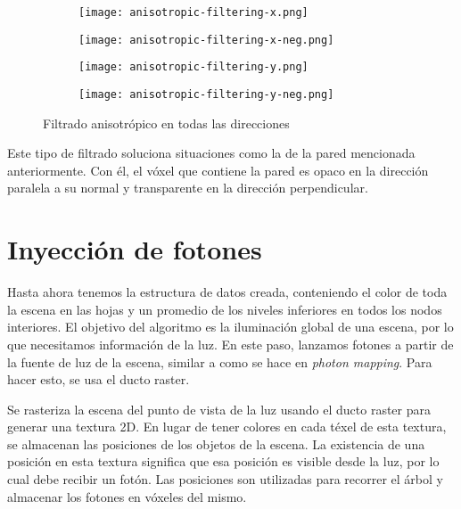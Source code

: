 \begin{figure}
    \begin{center}
        \begin{subfigure}{.24\textwidth}
            \texttt{[image: anisotropic-filtering-x.png]}
        \end{subfigure}
        \begin{subfigure}{.24\textwidth}
            \texttt{[image: anisotropic-filtering-x-neg.png]}
        \end{subfigure}
        \begin{subfigure}{.24\textwidth}
            \texttt{[image: anisotropic-filtering-y.png]}
        \end{subfigure}
        \begin{subfigure}{.24\textwidth}
            \texttt{[image: anisotropic-filtering-y-neg.png]}
        \end{subfigure}
    \end{center}
    \caption{Filtrado anisotrópico en todas las direcciones}
    \label{fig:svo_filtering_anisotropic}
\end{figure}

Este tipo de filtrado soluciona situaciones como la de la pared mencionada anteriormente.
Con él, el vóxel que contiene la pared es opaco en la dirección paralela a su normal y transparente en la dirección perpendicular.

\section{Inyección de fotones}\label{sec:photon-injection}

Hasta ahora tenemos la estructura de datos creada, conteniendo el color de toda la escena en las hojas y un promedio de los niveles inferiores en todos los nodos interiores.
El objetivo del algoritmo es la iluminación global de una escena, por lo que necesitamos información de la luz.
En este paso, lanzamos fotones a partir de la fuente de luz de la escena, similar a como se hace en \textit{photon mapping}.
Para hacer esto, se usa el ducto raster.

Se rasteriza la escena del punto de vista de la luz usando el ducto raster para generar una textura 2D.
En lugar de tener colores en cada téxel de esta textura, se almacenan las posiciones de los objetos de la escena.
La existencia de una posición en esta textura significa que esa posición es visible desde la luz, por lo cual debe recibir un fotón.
Las posiciones son utilizadas para recorrer el árbol y almacenar los fotones en vóxeles del mismo.

